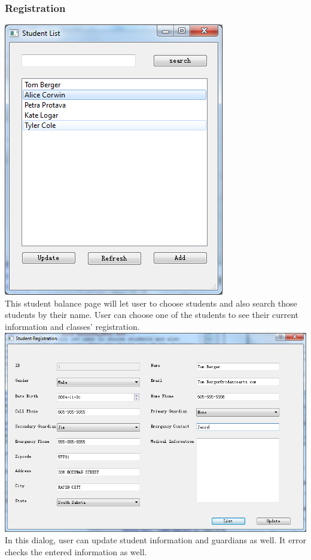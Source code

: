 \subsubsection{Registration}
\includegraphics[scale=0.5]{pics/reg_main.png}\\
This student balance page will let user to choose students and also search those students by their name. User can choose one of the students to see their current information and classes' registration. \\
\includegraphics[scale=0.5]{pics/reg_update.png}\\
In this dialog, user can update student information and guardians as well. It error checks the entered information as well.\\
